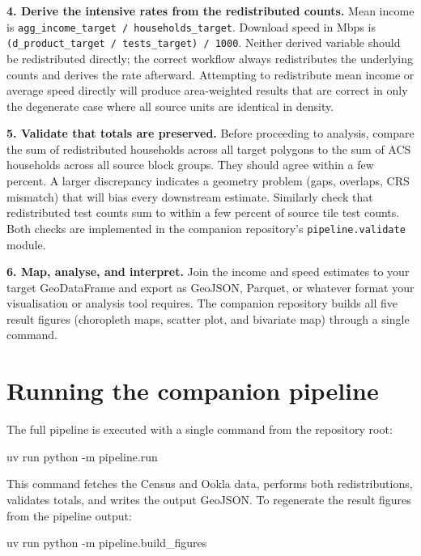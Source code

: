 \documentclass[
  letterpaper,
  DIV=11,
  numbers=noendperiod]{scrreprt}
\newenvironment{Shaded}{\begin{snugshade}}{\end{snugshade}}
\newcommand{\AttributeTok}[1]{\textcolor[rgb]{0.40,0.45,0.13}{#1}}
\newcommand{\ExtensionTok}[1]{\textcolor[rgb]{0.00,0.23,0.31}{#1}}
\newcommand{\NormalTok}[1]{\textcolor[rgb]{0.00,0.23,0.31}{#1}}
\begin{document}
\textbf{4. Derive the intensive rates from the redistributed counts.}
Mean income is \texttt{agg\_income\_target\ /\ households\_target}.
Download speed in Mbps is
\texttt{(d\_product\_target\ /\ tests\_target)\ /\ 1000}. Neither
derived variable should be redistributed directly; the correct workflow
always redistributes the underlying counts and derives the rate
afterward. Attempting to redistribute mean income or average speed
directly will produce area-weighted results that are correct in only the
degenerate case where all source units are identical in density.

\textbf{5. Validate that totals are preserved.} Before proceeding to
analysis, compare the sum of redistributed households across all target
polygons to the sum of ACS households across all source block groups.
They should agree within a few percent. A larger discrepancy indicates a
geometry problem (gaps, overlaps, CRS mismatch) that will bias every
downstream estimate. Similarly check that redistributed test counts sum
to within a few percent of source tile test counts. Both checks are
implemented in the companion repository's \texttt{pipeline.validate}
module.

\textbf{6. Map, analyse, and interpret.} Join the income and speed
estimates to your target GeoDataFrame and export as GeoJSON, Parquet, or
whatever format your visualisation or analysis tool requires. The
companion repository builds all five result figures (choropleth maps,
scatter plot, and bivariate map) through a single command.

\section{Running the companion
pipeline}\label{running-the-companion-pipeline}

The full pipeline is executed with a single command from the repository
root:

\begin{Shaded}
\begin{Highlighting}[]
\ExtensionTok{uv}\NormalTok{ run python }\AttributeTok{{-}m}\NormalTok{ pipeline.run}
\end{Highlighting}
\end{Shaded}

This command fetches the Census and Ookla data, performs both
redistributions, validates totals, and writes the output GeoJSON. To
regenerate the result figures from the pipeline output:

\begin{Shaded}
\begin{Highlighting}[]
\ExtensionTok{uv}\NormalTok{ run python }\AttributeTok{{-}m}\NormalTok{ pipeline.build\_figures}
\end{Highlighting}
\end{Shaded}
\end{document}
